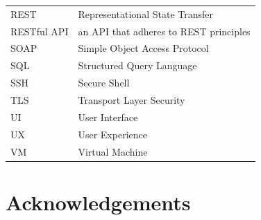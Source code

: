 \documentclass{Configuration_Files/PoliMi3i_thesis}
\begin{document}
\begin{table}[H]
\begin{tabular}{ll}
        REST & Representational State Transfer \\[2px]
        RESTful API & an API that adheres to REST principles \\[2px]
        SOAP & Simple Object Access Protocol \\[2px]
        SQL & Structured Query Language \\[2px]
        SSH & Secure Shell \\[2px]
        TLS & Transport Layer Security \\[2px]
        UI & User Interface \\[2px]
        UX & User Experience \\[2px]
        VM & Virtual Machine \\[2px]
    \end{tabular}
\end{table}



\chapter*{Acknowledgements}
\end{document}
